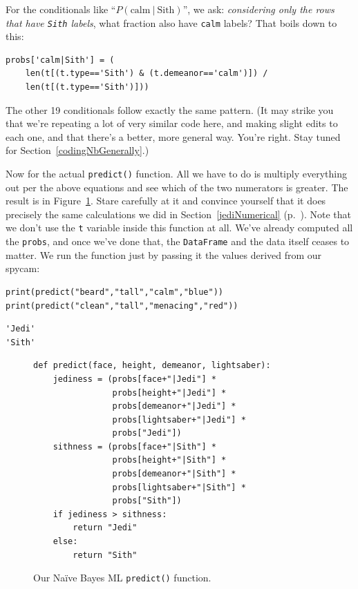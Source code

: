 For the conditionals like ``$P(\textrm{calm}\ |\ \textrm{Sith})$'', we ask:
\textit{considering only the rows that have \texttt{Sith} labels}, what
fraction also have \texttt{calm} labels? That boils down to this:

\label{calcConditionals}
\footnotesize
\begin{Verbatim}[fontsize=\small,samepage=true,frame=single,framesep=3mm]
probs['calm|Sith'] = (
    len(t[(t.type=='Sith') & (t.demeanor=='calm')]) /
    len(t[(t.type=='Sith')]))
\end{Verbatim}
\normalsize

The other 19 conditionals follow exactly the same pattern. (It may strike you
that we're repeating a lot of very similar code here, and making slight edits
to each one, and that there's a better, more general way. You're right. Stay
tuned for Section~\ref{codingNbGenerally}.)


Now for the actual \texttt{predict()} function. All we have to do is multiply
everything out per the above equations and see which of the two numerators is
greater. The result is in Figure~\ref{fig:predictFunc}. Stare carefully at it
and convince yourself that it does precisely the same calculations we did in
Section~\ref{jediNumerical} (p.~\pageref{jediNumerical}). Note that we don't
use the \texttt{t} variable inside this function at all. We've already computed
all the \texttt{probs}, and once we've done that, the \texttt{DataFrame} and
the data itself ceases to matter. We run the function just by passing it the
values derived from our spycam:


\begin{Verbatim}[fontsize=\small,samepage=true,frame=single,framesep=3mm]
print(predict("beard","tall","calm","blue"))
print(predict("clean","tall","menacing","red"))
\end{Verbatim}
\vspace{-.4in}

\begin{Verbatim}[fontsize=\small,samepage=true,frame=leftline,framesep=5mm,framerule=1mm]
'Jedi'
'Sith'
\end{Verbatim}
\vspace{.4in}

\begin{figure}[hb]
\begin{Verbatim}[fontsize=\small,samepage=true,frame=single,framesep=3mm]
def predict(face, height, demeanor, lightsaber):
    jediness = (probs[face+"|Jedi"] *
                probs[height+"|Jedi"] *
                probs[demeanor+"|Jedi"] *
                probs[lightsaber+"|Jedi"] *
                probs["Jedi"])
    sithness = (probs[face+"|Sith"] *
                probs[height+"|Sith"] *
                probs[demeanor+"|Sith"] *
                probs[lightsaber+"|Sith"] *
                probs["Sith"])
    if jediness > sithness:
        return "Jedi"
    else:
        return "Sith"
\end{Verbatim}
\caption{Our Na\"{i}ve Bayes ML \texttt{predict()} function.}
\label{fig:predictFunc}
\end{figure}

